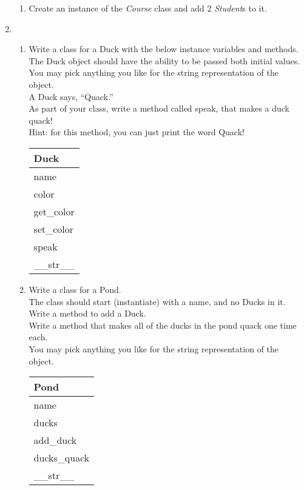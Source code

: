 \documentclass{article}
\begin{document}
\begin{enumerate}
\begin{enumerate}
		\item
			Create an instance of the \textit{Course} class and add 2 \textit{Student}s to it.
	\end{enumerate}
\pagebreak





	\item
	\begin{enumerate}
		\item
			Write a class for a Duck with the below instance variables and methods. \\ 
			The Duck object should have the ability to be passed both initial values.\\  
			You may pick anything you like for the string representation of the object.\\
			A Duck says, ``Quack.''\\  
			As part of your class, write a method called speak, that makes a duck quack!\\
			Hint: for this method, you can just print the word Quack!
			\begin{flushright}
			\begin{tabular}{|l|}
				\hline
				Duck\\ \hline
				name\\	color\\	 \hline
				get\_color \\ set\_color \\ speak \\ \_\_str\_\_ \\ \hline
			\end{tabular}
			\end{flushright}

		\item
			Write a class for a Pond. \\
			The class should start (instantiate) with a name, and no Ducks in it. \\ 
			Write a method to add a Duck.\\
			Write a method that makes all of the ducks in the pond quack one time each.\\
			You may pick anything you like for the string representation of the object.
	
			\begin{flushright}
			\begin{tabular}{|l|}
				\hline
				Pond\\ \hline  	%
				name\\ ducks\\ \hline		%
				add\_duck\\ ducks\_quack \\ \_\_str\_\_ \\ \hline		%
			\end{tabular}
			\end{flushright}


\end{enumerate}
\end{enumerate}
\end{document}
